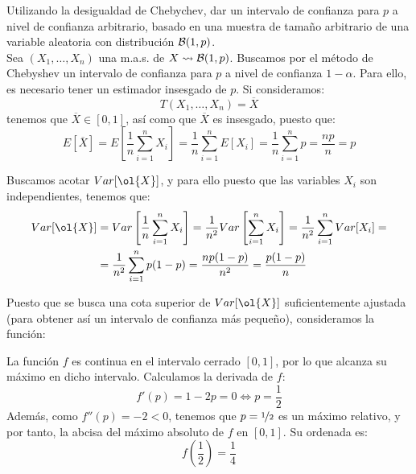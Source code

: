 \begin{ejercicio}
    Utilizando la desigualdad de Chebychev, dar un intervalo de confianza para $p$ a nivel de confianza arbitrario, basado en una muestra de tamaño arbitrario de una variable aleatoria con distribución $\mathcal{B}(1,p)$.\\

    Sea $(X_1, \ldots, X_n)$ una m.a.s. de $X\rightsquigarrow \mathcal{B}(1,p)$. Buscamos por el método de Chebyshev un intervalo de confianza para $p$ a nivel de confianza $1-\alpha$. Para ello, es necesario tener un estimador insesgado de $p$. Si consideramos:
    \begin{equation*}
        T(X_1, \ldots, X_n) = \overline{X}
    \end{equation*}
    tenemos que $\overline{X}\in [0,1]$, así como que $\overline{X}$ es insesgado, puesto que:
    \begin{equation*}
        E[\overline{X}] = E\left[\frac{1}{n}\sum_{i=1}^{n}X_i\right] = \frac{1}{n}\sum_{i=1}^{n}E[X_i] = \frac{1}{n}\sum_{i=1}^{n}p = \frac{np}{n} = p
    \end{equation*}

    Buscamos acotar $Var[\ol{X}]$, y para ello puesto que las variables $X_i$ son independientes, tenemos que:
    \begin{align*}
        Var[\ol{X}] &= Var\left[\frac{1}{n}\sum_{i=1}^{n}X_i\right] = \frac{1}{n^2}Var\left[\sum_{i=1}^{n}X_i\right] = \frac{1}{n^2}\sum_{i=1}^{n}Var[X_i] =\\&= \frac{1}{n^2}\sum_{i=1}^{n}p(1-p) = \frac{np(1-p)}{n^2} = \frac{p(1-p)}{n}
    \end{align*}

    Puesto que se busca una cota superior de $Var[\ol{X}]$ suficientemente ajustada (para obtener así un intervalo de confianza más pequeño), consideramos la función:

    La función $f$ es continua en el intervalo cerrado $[0,1]$, por lo que alcanza su máximo en dicho intervalo. Calculamos la derivada de $f$:
    \begin{equation*}
        f'(p) = 1-2p=0\iff p=\frac{1}{2}
    \end{equation*}
    Además, como $f''(p)=-2<0$, tenemos que $p=\nicefrac{1}{2}$ es un máximo relativo, y por tanto, la abcisa del máximo absoluto de $f$ en $[0,1]$. Su ordenada es:
    \begin{equation*}
        f\left(\frac{1}{2}\right) = \frac{1}{4}
    \end{equation*}


\end{ejercicio}
